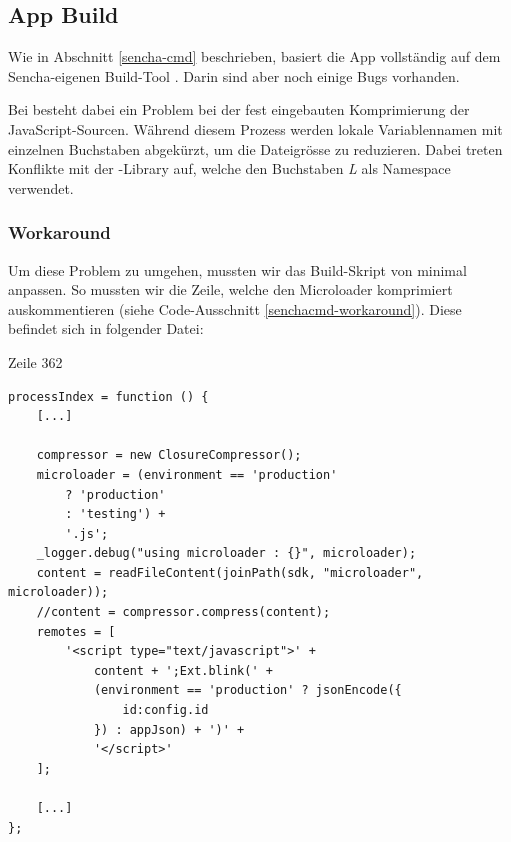 \subsection{App Build}
Wie in Abschnitt \ref{sencha-cmd} beschrieben, basiert die App vollständig auf dem Sencha-eigenen Build-Tool . Darin sind aber noch einige Bugs vorhanden.

Bei \kort{} besteht dabei ein Problem bei der fest eingebauten Komprimierung der JavaScript-Sourcen.
Während diesem Prozess werden lokale Variablennamen mit einzelnen Buchstaben abgekürzt, um die Dateigrösse zu reduzieren.
Dabei treten Konflikte mit der -Library auf, welche den Buchstaben \emph{L} als Namespace verwendet.

\subsubsection{Workaround}
Um diese Problem zu umgehen, mussten wir das Build-Skript von  minimal anpassen.
So mussten wir die Zeile, welche den \gls{Microloader} komprimiert auskommentieren (siehe Code-Ausschnitt \ref{senchacmd-workaround}).
Diese befindet sich in folgender Datei:

 Zeile 362

\lstset{language=JavaScript}
\begin{lstlisting}[caption=Sencha Cmd Workaround, label=senchacmd-workaround]
processIndex = function () {
	[...]
	
	compressor = new ClosureCompressor();
	microloader = (environment == 'production'
		? 'production'
		: 'testing') +
		'.js';
	_logger.debug("using microloader : {}", microloader);
	content = readFileContent(joinPath(sdk, "microloader", microloader));
	//content = compressor.compress(content);
	remotes = [
		'<script type="text/javascript">' +
			content + ';Ext.blink(' +
			(environment == 'production' ? jsonEncode({
				id:config.id
			}) : appJson) + ')' +
			'</script>'
	];
	
	[...]
};
\end{lstlisting}